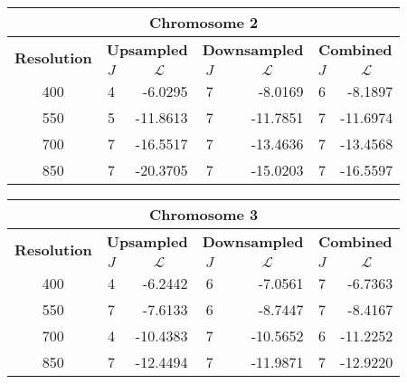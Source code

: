 \begin{table}[h!]
  \centering
\begin{tabular}{|c|c|r|c|r|c|r|}\hline
\multicolumn{7}{|c|}{\textbf{Chromosome 2}} \\ \hline
\multirow{2}{*}{\textbf{Resolution}} & \multicolumn{2}{|c|}{\textbf{Upsampled}} &  \multicolumn{2}{|c|}{\textbf{Downsampled}} &  \multicolumn{2}{|c|}{\textbf{Combined}} \\ \cline{2-7}
    & $J$ & \multicolumn{1}{|c|}{\textbf{$\mathcal{L}$}} & $J$ & \multicolumn{1}{|c|}{\textbf{$\mathcal{L}$}} &$J$ & \multicolumn{1}{|c|}{\textbf{$\mathcal{L}$}}   \\ \hline
400 & 4 & -6.0295 & 7 & -8.0169 & 6 & -8.1897  \\ \hline
550 & 5 & -11.8613 & 7 & -11.7851 & 7 & -11.6974  \\ \hline
700 & 7 & -16.5517 & 7 & -13.4636 & 7 & -13.4568  \\ \hline
850 & 7 & -20.3705 & 7 & -15.0203 & 7 &  -16.5597 \\ \hline
\end{tabular}
\end{table}



\begin{table}[h!]
  \centering
\begin{tabular}{|c|c|r|c|r|c|r|}\hline
\multicolumn{7}{|c|}{\textbf{Chromosome 3}} \\ \hline
\multirow{2}{*}{\textbf{Resolution}} & \multicolumn{2}{|c|}{\textbf{Upsampled}} &  \multicolumn{2}{|c|}{\textbf{Downsampled}} &  \multicolumn{2}{|c|}{\textbf{Combined}} \\ \cline{2-7}
    & $J$ & \multicolumn{1}{|c|}{\textbf{$\mathcal{L}$}} & $J$ & \multicolumn{1}{|c|}{\textbf{$\mathcal{L}$}} &$J$ & \multicolumn{1}{|c|}{\textbf{$\mathcal{L}$}}   \\ \hline
400 & 4 & -6.2442 & 6 & -7.0561 & 7 & -6.7363  \\ \hline
550 & 7 & -7.6133 & 6 & -8.7447 & 7 & -8.4167  \\ \hline
700 & 4 & -10.4383 & 7 & -10.5652 & 6 & -11.2252  \\ \hline
850 & 7 & -12.4494 & 7 & -11.9871 & 7 & -12.9220  \\ \hline
\end{tabular}
\end{table}

